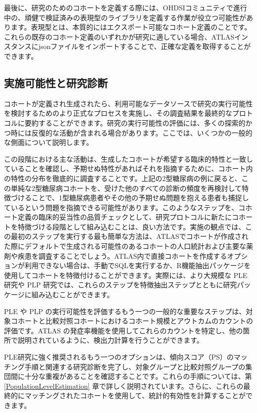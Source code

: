 \documentclass[
  11pt]{book}
\theoremstyle{definition}
\theoremstyle{definition}
\theoremstyle{definition}
\theoremstyle{definition}
\theoremstyle{remark}
\begin{document}
最後に、研究のためのコホートを定義する際には、OHDSIコミュニティで進行中の、頑健で検証済みの表現型のライブラリを定義する作業が役立つ可能性があります。表現型とは、本質的にはエクスポート可能なコホート定義のことです。これらの既存のコホート定義のいずれかが研究に適している場合、ATLASインスタンスにjsonファイルをインポートすることで、正確な定義を取得することができます。

\subsection{実施可能性と研究診断}\label{Feasibility}

 

コホートが定義され生成されたら、利用可能なデータソースで研究の実行可能性を検討するためのより正式なプロセスを実施し、その調査結果を最終的なプロトコルに要約することができます。研究の実行可能性の評価には、多くの探索的かつ時には反復的な活動が含まれる場合があります。ここでは、いくつかの一般的な側面について説明します。

この段階における主な活動は、生成したコホートが希望する臨床的特性と一致していることを確認し、予期せぬ特性があればそれを指摘するために、コホート内の特性の分布を徹底的に調査することです。上記の2型糖尿病の例に戻ると、この単純な2型糖尿病コホートを、受けた他のすべての診断の頻度を再検討して特徴づけることで、1型糖尿病患者やその他の予期せぬ問題を抱える患者も捕捉しているという問題を指摘できる可能性があります。このようなステップを、コホート定義の臨床的妥当性の品質チェックとして、研究プロトコルに新たにコホートを特徴づける段階として組み込むことは、良い方法です。実施の観点では、この最初のステップを実行する最も簡単な方法は、ATLASでコホートが作成された際にデフォルトで生成される可能性のあるコホートの人口統計および主要な薬剤や疾患を調査することでしょう。ATLAS内で直接コホートを作成するオプションが利用できない場合は、手動でSQLを実行するか、R機能抽出パッケージを使用してコホートを特徴付けることができます。実際には、より大規模な PLE 研究や PLP 研究では、これらのステップを特徴抽出ステップとともに研究パッケージに組み込むことができます。

PLE や PLP の実行可能性を評価するもう一つの一般的な重要なステップは、対象コホートと比較対照コホートにおけるコホート規模とアウトカムのカウントの評価です。ATLAS の発症率機能を使用してこれらのカウントを特定し、他の箇所で説明されているように、検出力計算を行うことができます。

PLE研究に強く推奨されるもう一つのオプションは、傾向スコア（PS）のマッチング手順と関連する研究診断を完了し、対象グループと比較対照グループの集団間に十分な重複があることを確認することです。これらの手順については、第 \ref{PopulationLevelEstimation} 章で詳しく説明されています。さらに、これらの最終的にマッチングされたコホートを使用して、統計的有効性を計算することができます。
\end{document}
